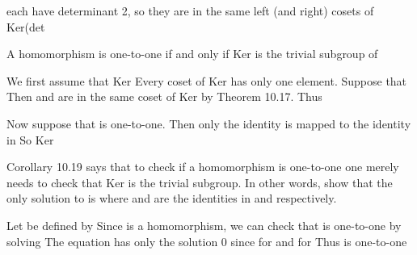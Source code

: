 \documentclass[11pt,oneside]{article}
\begin{document}
\begin{BookBody}
\noindent each have determinant 2, so they are in the same left (and right) cosets of Ker(det\BookEnd{\blacktriangle}

 A homomorphism  is one-to-one if and only if Ker\BookInline{(\phi )} is the trivial subgroup of 

 We first assume that Ker Every coset of Ker\BookInline{(\phi )} has only one element. Suppose that  Then  and  are in the same coset of Ker\BookInline{(\phi )} by Theorem 10.17. Thus 

Now suppose that \BookInline{\phi } is one-to-one. Then only the identity  is mapped to the identity in  So Ker\BookEnd{\blacklozenge}

Corollary 10.19 says that to check if a homomorphism  is one-to-one one merely needs to check that Ker\BookInline{(\phi )} is the trivial subgroup. In other words, show that the only solution to  is  where  and  are the identities in  and  respectively.

 Let  be defined by  Since \BookInline{\phi } is a homomorphism, we can check that \BookInline{\phi } is one-to-one by solving  The equation  has only the solution 0 since for  and for  Thus \BookInline{\phi } is one-to-one\BookEnd{\blacktriangle}

\end{BookBody}

\BookNarrativefalse
\end{document}
